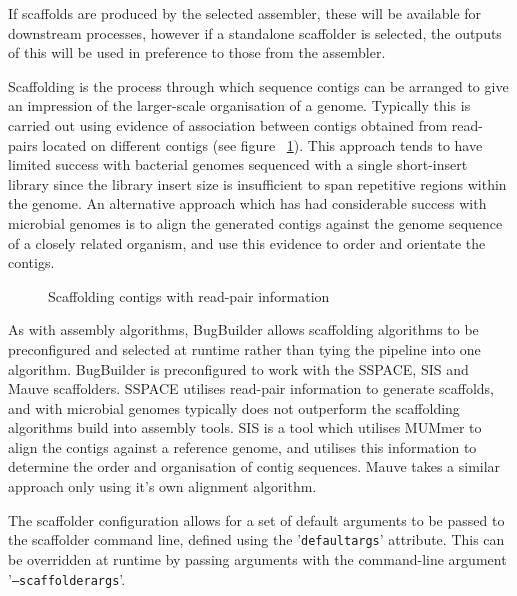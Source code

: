 \documentclass[a4paper,10pt]{article}
\begin{document}
If scaffolds are produced by the selected assembler, these will be available
for downstream processes, however if a standalone scaffolder is selected, the
outputs of this will be used in preference to those from the assembler. 

Scaffolding is the process through which sequence contigs can be arranged to
give an impression of the larger-scale organisation of a genome. Typically this
is carried out using evidence of association between contigs obtained from
read-pairs located on different contigs (see figure
~\ref{fig:ReadPairScaffolding}). This approach tends to have limited success
with bacterial genomes sequenced with a single short-insert library since the
library insert size is insufficient to span repetitive regions within the
genome. An alternative approach which has had considerable success with
microbial genomes is to align the generated contigs against the genome sequence
of a closely related organism, and use this evidence to order and orientate the
contigs.

\begin{figure}[ht]
\caption{Scaffolding contigs with read-pair information}
\label{fig:ReadPairScaffolding}
\end{figure}

As with assembly algorithms, BugBuilder allows scaffolding algorithms to be
preconfigured and selected at runtime rather than tying the pipeline into one
algorithm. BugBuilder is preconfigured to work with the SSPACE, SIS and Mauve
scaffolders. SSPACE utilises read-pair information to generate scaffolds, and
with microbial genomes typically does not outperform the scaffolding algorithms
build into assembly tools. SIS is a tool which utilises MUMmer to align the
contigs against a reference genome, and utilises this information to determine
the order and organisation of contig sequences. Mauve takes a similar approach
only using it's own alignment algorithm. 

The scaffolder configuration allows for a set of default arguments to be passed
to the scaffolder command line, defined using the '{\tt default\-args}'
attribute. This can be overridden at runtime by passing arguments with the
command-line argument '{\tt --scaffolder\-args}'. 
\end{document}
